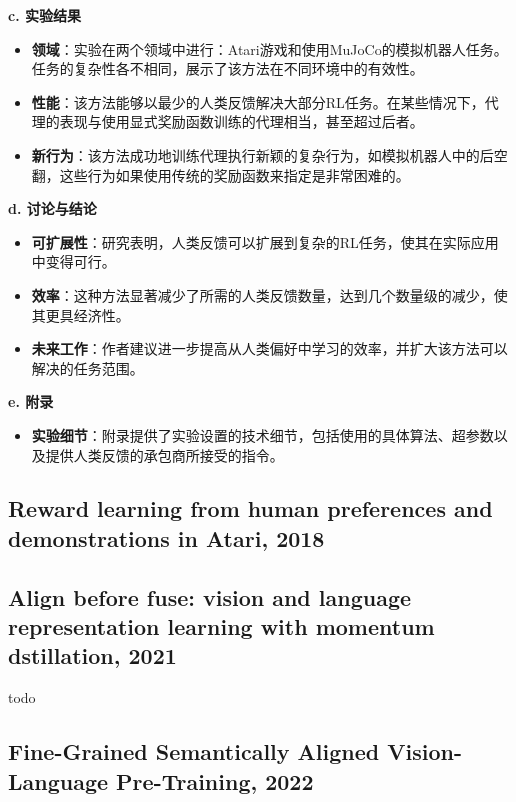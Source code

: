 \documentclass[twocolumn, 10pt]{article} %
\begin{document}
\noindent\textbf{c. 实验结果}
\begin{itemize}
    \item \textbf{领域}：实验在两个领域中进行：Atari游戏和使用MuJoCo的模拟机器人任务。任务的复杂性各不相同，展示了该方法在不同环境中的有效性。
    \item \textbf{性能}：该方法能够以最少的人类反馈解决大部分RL任务。在某些情况下，代理的表现与使用显式奖励函数训练的代理相当，甚至超过后者。
    \item \textbf{新行为}：该方法成功地训练代理执行新颖的复杂行为，如模拟机器人中的后空翻，这些行为如果使用传统的奖励函数来指定是非常困难的。
\end{itemize}

\noindent\textbf{d. 讨论与结论}
\begin{itemize}
    \item \textbf{可扩展性}：研究表明，人类反馈可以扩展到复杂的RL任务，使其在实际应用中变得可行。
    \item \textbf{效率}：这种方法显著减少了所需的人类反馈数量，达到几个数量级的减少，使其更具经济性。
    \item \textbf{未来工作}：作者建议进一步提高从人类偏好中学习的效率，并扩大该方法可以解决的任务范围。
\end{itemize}

\noindent\textbf{e. 附录}
\begin{itemize}
    \item \textbf{实验细节}：附录提供了实验设置的技术细节，包括使用的具体算法、超参数以及提供人类反馈的承包商所接受的指令。
\end{itemize}








\subsection{Reward learning from human preferences and demonstrations in Atari, 2018}


\subsection{Align before fuse: vision and language representation learning with momentum dstillation, 2021}
todo

\subsection{Fine-Grained Semantically Aligned Vision-Language Pre-Training, 2022}
\end{document}

